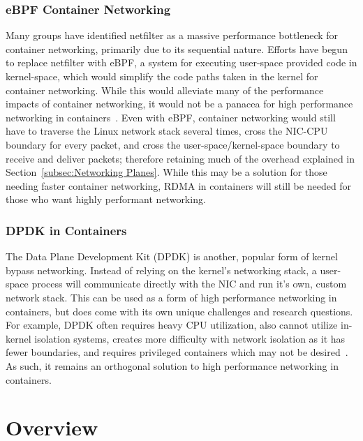 \documentclass[12pt,titlepage]{article}
\begin{document}
\subsubsection{eBPF Container Networking}
Many groups have identified netfilter as a massive performance bottleneck for container networking, primarily due to its sequential nature.
Efforts have begun to replace netfilter with eBPF, a system for executing user-space provided code in kernel-space, which would simplify the code paths taken in the kernel for container networking.
While this would alleviate many of the performance impacts of container networking, it would not be a panacea for high performance networking in containers~\cite{ciliumiptablesebpf,ciliumebpf}.
Even with eBPF, container networking would still have to traverse the Linux network stack several times, cross the NIC-CPU boundary for every packet, and cross the user-space/kernel-space boundary to receive and deliver packets;
therefore retaining much of the overhead explained in Section~\ref{subsec:Networking Planes}.
While this may be a solution for those needing faster container networking, RDMA in containers will still be needed for those who want highly performant networking.

\subsubsection{DPDK in Containers}
The Data Plane Development Kit (DPDK) is another, popular form of kernel bypass networking.
Instead of relying on the kernel's networking stack, a user-space process will communicate directly with the NIC and run it's own, custom network stack.
This can be used as a form of high performance networking in containers, but does come with its own unique challenges and research questions.
For example, DPDK often requires heavy CPU utilization, also cannot utilize in-kernel isolation systems, creates more difficulty with network isolation as it has fewer boundaries, and requires privileged containers which may not be desired~\cite{dpdkcontainers,dpdkperformancecontainers,inteldpdk}.
As such, it remains an orthogonal solution to high performance networking in containers.

\section{Overview}
\end{document}
